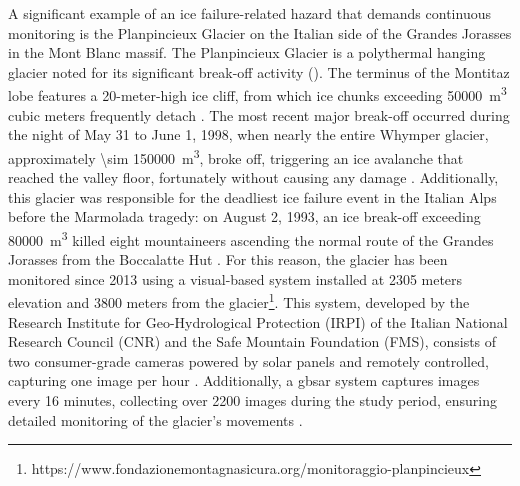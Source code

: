 A significant example of an ice failure-related hazard that demands continuous monitoring is the Planpincieux Glacier on the Italian side of the Grandes Jorasses in the Mont Blanc massif. 
The Planpincieux Glacier is a polythermal hanging glacier noted for its significant break-off activity ().
The terminus of the Montitaz lobe features a 20-meter-high ice cliff, from which ice chunks exceeding \qty{50000}{\cubic\meter}  cubic meters frequently detach \cite{Giordan2020a}. 
The most recent major break-off occurred during the night of May 31 to June 1, 1998, when nearly the entire Whymper glacier, approximately \SI{\sim 150000}{\cubic\meter}, broke off, triggering an ice avalanche that reached the valley floor, fortunately without causing any damage \cite{Faillettaz2016, chiarle2023}. 
Additionally, this glacier was responsible for the deadliest ice failure event in the Italian Alps before the Marmolada tragedy: on August 2, 1993, an ice break-off exceeding \qty{80000}{\cubic\meter} killed eight mountaineers ascending the normal route of the Grandes Jorasses from the Boccalatte Hut \cite{Faillettaz2016, chiarle2023}.
For this reason, the glacier has been monitored since 2013 using a visual-based system installed at 2305 meters elevation and 3800 meters from the glacier\footnote{https://www.fondazionemontagnasicura.org/monitoraggio-planpincieux}. 
This system, developed by the Research Institute for Geo-Hydrological Protection (IRPI) of the Italian National Research Council (CNR) and the Safe Mountain Foundation (FMS), consists of two consumer-grade cameras powered by solar panels and remotely controlled, capturing one image per hour \cite{Dematteis2018, Giordan2020a}.
Additionally, a \ac{gbsar} system captures images every 16 minutes, collecting over 2200 images during the study period, ensuring detailed monitoring of the glacier's movements \cite{Dematteis2018}.

